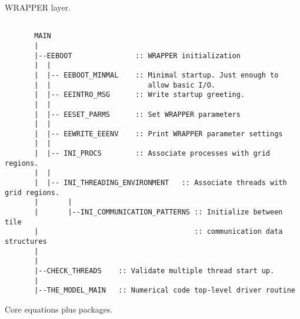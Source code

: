 WRAPPER layer.

{\footnotesize
\begin{verbatim}

       MAIN  
       |
       |--EEBOOT               :: WRAPPER initialization
       |  |
       |  |-- EEBOOT_MINMAL    :: Minimal startup. Just enough to
       |  |                       allow basic I/O.
       |  |-- EEINTRO_MSG      :: Write startup greeting.
       |  |
       |  |-- EESET_PARMS      :: Set WRAPPER parameters
       |  |
       |  |-- EEWRITE_EEENV    :: Print WRAPPER parameter settings
       |  |
       |  |-- INI_PROCS        :: Associate processes with grid regions.
       |  |
       |  |-- INI_THREADING_ENVIRONMENT   :: Associate threads with grid regions.
       |       |
       |       |--INI_COMMUNICATION_PATTERNS :: Initialize between tile 
       |                                     :: communication data structures
       |
       |
       |--CHECK_THREADS    :: Validate multiple thread start up.
       |
       |--THE_MODEL_MAIN   :: Numerical code top-level driver routine

\end{verbatim}
}

Core equations plus packages.

